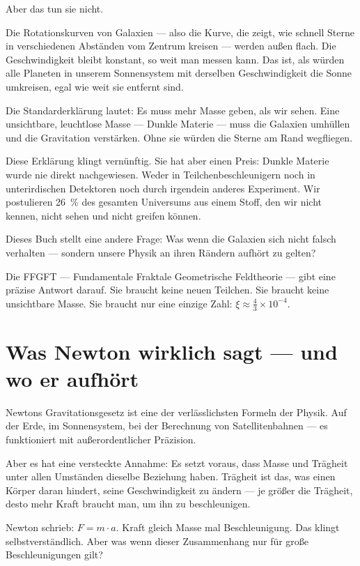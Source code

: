\documentclass[11pt,oneside]{book}
\begin{document}
Aber das tun sie nicht.

Die Rotationskurven von Galaxien — also die Kurve, die zeigt,
wie schnell Sterne in verschiedenen Abständen vom Zentrum
kreisen — werden außen flach. Die Geschwindigkeit bleibt
konstant, so weit man messen kann. Das ist, als würden alle
Planeten in unserem Sonnensystem mit derselben Geschwindigkeit
die Sonne umkreisen, egal wie weit sie entfernt sind.

Die Standarderklärung lautet: Es muss mehr Masse geben, als
wir sehen. Eine unsichtbare, leuchtlose Masse — Dunkle Materie
— muss die Galaxien umhüllen und die Gravitation verstärken.
Ohne sie würden die Sterne am Rand wegfliegen.

Diese Erklärung klingt vernünftig. Sie hat aber einen Preis:
Dunkle Materie wurde nie direkt nachgewiesen. Weder in
Teilchenbeschleunigern noch in unterirdischen Detektoren noch
durch irgendein anderes Experiment. Wir postulieren 26~\%
des gesamten Universums aus einem Stoff, den wir nicht kennen,
nicht sehen und nicht greifen können.

Dieses Buch stellt eine andere Frage: Was wenn die Galaxien
sich nicht falsch verhalten — sondern unsere Physik an ihren
Rändern aufhört zu gelten?

Die FFGFT — Fundamentale Fraktale Geometrische Feldtheorie —
gibt eine präzise Antwort darauf. Sie braucht keine neuen
Teilchen. Sie braucht keine unsichtbare Masse. Sie braucht
nur eine einzige Zahl: $\xi \approx \tfrac{4}{3} \times 10^{-4}$.

\chapter{Was Newton wirklich sagt — und wo er aufhört}

Newtons Gravitationsgesetz ist eine der verlässlichsten
Formeln der Physik. Auf der Erde, im Sonnensystem, bei der
Berechnung von Satellitenbahnen — es funktioniert mit
außerordentlicher Präzision.

Aber es hat eine versteckte Annahme: Es setzt voraus, dass
Masse und Trägheit unter allen Umständen dieselbe Beziehung
haben. Trägheit ist das, was einen Körper daran hindert, seine
Geschwindigkeit zu ändern — je größer die Trägheit, desto mehr
Kraft braucht man, um ihn zu beschleunigen.

Newton schrieb: $F = m \cdot a$. Kraft gleich Masse mal
Beschleunigung. Das klingt selbstverständlich. Aber was wenn
dieser Zusammenhang nur für große Beschleunigungen gilt?
\end{document}
